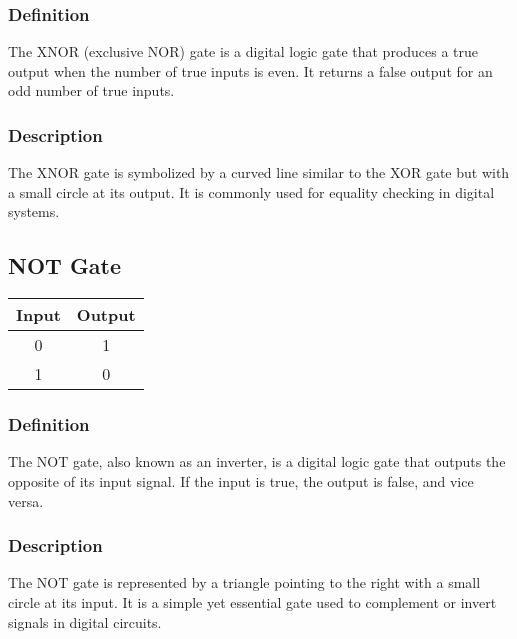 \documentclass{article}
\begin{document}
\subsubsection{Definition} 
The XNOR (exclusive NOR) gate is a digital logic gate that produces a true output when the number of true inputs is even. It returns a false output for an odd number of true inputs.

\subsubsection{Description} 
The XNOR gate is symbolized by a curved line similar to the XOR gate but with a small circle at its output. It is commonly used for equality checking in digital systems.

\subsection{NOT Gate}
\begin{center}
  \begin{tabular}{|c|c|}
    \hline
    \textbf{Input} & \textbf{Output} \\
    \hline
    0 & 1 \\
    1 & 0 \\
    \hline
  \end{tabular}
\end{center}

\subsubsection{Definition} 
The NOT gate, also known as an inverter, is a digital logic gate that outputs the opposite of its input signal. If the input is true, the output is false, and vice versa.

\subsubsection{Description} 
The NOT gate is represented by a triangle pointing to the right with a small circle at its input. It is a simple yet essential gate used to complement or invert signals in digital circuits.
\end{document}
